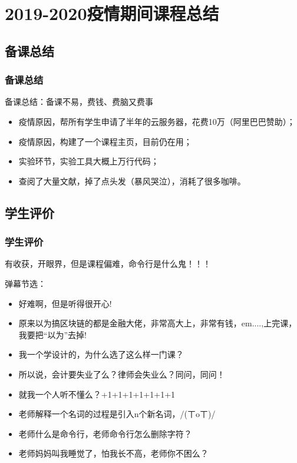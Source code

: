 \documentclass[11pt]{beamer}
\begin{document}
\begin{frame}
\begin{figure}
{\begin{minipage}[ht]{0.35\linewidth}
				\label{fig:teacher}
			\end{minipage}%
		}%
	\end{figure}

\end{frame}


\section{2019-2020疫情期间课程总结}
\subsection{备课总结}
\begin{frame}
	\frametitle{备课总结}
	备课总结：备课不易，费钱、费脑又费事~
	\begin{itemize}
		\item 疫情原因，帮所有学生申请了半年的云服务器，花费10万（阿里巴巴赞助）；
		\item 疫情原因，构建了一个课程主页，目前仍在用；
		\item 实验环节，实验工具大概上万行代码；
		\item 查阅了大量文献，掉了点头发（暴风哭泣），消耗了很多咖啡。
	\end{itemize}
\end{frame}
\subsection{学生评价}
\begin{frame}
	\frametitle{学生评价}
	有收获，开眼界，但是课程偏难，命令行是什么鬼！！！

	弹幕节选：
	\begin{itemize}
		\item 好难啊，但是听得很开心!
		\item 原来以为搞区块链的都是金融大佬，非常高大上，非常有钱，em....,上完课，我要把“以为”去掉!
		\item 我一个学设计的，为什么选了这么样一门课？
		\item 所以说，会计要失业了么？律师会失业么？同问，同问！
		\item 就我一个人听不懂么？+1+1+1+1+1+1+1
		\item 老师解释一个名词的过程是引入n个新名词，/(ㄒoㄒ)/~~
		\item 老师什么是命令行，老师命令行怎么删除字符？
		\item 老师妈妈叫我睡觉了，怕我长不高，老师你不困么？
	\end{itemize}
\end{frame}
\end{document}
